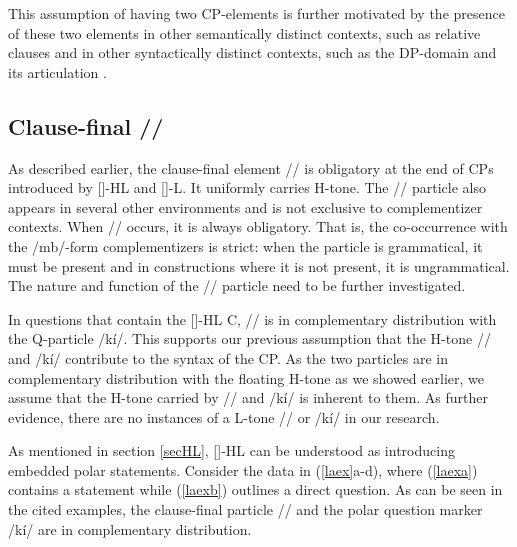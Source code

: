 \documentclass[output=paper,colorlinks,citecolor=brown]{langscibook}
\begin{document}
This assumption of having two CP-elements is further motivated by the presence of these two elements in other semantically distinct contexts, such as relative clauses \citep{Kouankem2011} and in other syntactically distinct contexts, such as the DP-domain and its articulation \citep{Kouankem2011, Kouankem2012}.

\subsection{Clause-final /\la/}

As described earlier, the clause-final element /\la/ is obligatory at the end of CPs introduced by [\mbuHL]-HL and [\nda]-L. It uniformly carries H-tone. The /\la/ particle also appears in several other environments and is not exclusive to complementizer contexts. When /\la/ occurs, it is always obligatory. That is, the co-occurrence with the /mb\baru/-form complementizers is strict: when the particle is grammatical, it must be present and in constructions where it is not present, it is ungrammatical. The nature and function of the /\la/ particle need to be further investigated.

In questions that contain the [\mbuHL]-HL C, /\la/ is in complementary distribution with the Q-particle /k{í}/. This supports our previous assumption that the H-tone /\la/ and /k{í}/ contribute to the syntax of the CP. As the two particles are in complementary distribution with the floating H-tone as we showed earlier, we assume that the H-tone carried by /\la/ and /k{í}/ is inherent to them. As further evidence, there are no instances of a L-tone /\la/ or /k{í}/ in our research.

As mentioned in section \ref{secHL}, [\mbuHL]-HL can be understood as introducing embedded polar statements. Consider the data in (\ref{laex}a-d), where (\ref{laexa}) contains a statement while (\ref{laexb}) outlines a direct question. As can be seen in the cited examples, the clause-final particle /\la/ and the polar question marker /k{í}/ are in complementary distribution.
\end{document}
